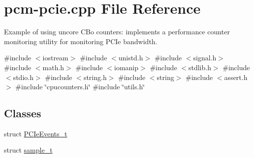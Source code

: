 \hypertarget{pcm-pcie_8cpp}{}\section{pcm-\/pcie.cpp File Reference}
\label{pcm-pcie_8cpp}


Example of using uncore C\+Bo counters\+: implements a performance counter monitoring utility for monitoring P\+C\+Ie bandwidth.  


{\ttfamily \#include $<$iostream$>$}\newline
{\ttfamily \#include $<$unistd.\+h$>$}\newline
{\ttfamily \#include $<$signal.\+h$>$}\newline
{\ttfamily \#include $<$math.\+h$>$}\newline
{\ttfamily \#include $<$iomanip$>$}\newline
{\ttfamily \#include $<$stdlib.\+h$>$}\newline
{\ttfamily \#include $<$stdio.\+h$>$}\newline
{\ttfamily \#include $<$string.\+h$>$}\newline
{\ttfamily \#include $<$string$>$}\newline
{\ttfamily \#include $<$assert.\+h$>$}\newline
{\ttfamily \#include \char`\"{}cpucounters.\+h\char`\"{}}\newline
{\ttfamily \#include \char`\"{}utils.\+h\char`\"{}}\newline
\subsection*{Classes}
\begin{DoxyCompactItemize}
\item 
struct \mbox{\hyperlink{struct_p_c_ie_events__t}{P\+C\+Ie\+Events\+\_\+t}}
\item 
struct \mbox{\hyperlink{structsample__t}{sample\+\_\+t}}
\end{DoxyCompactItemize}
